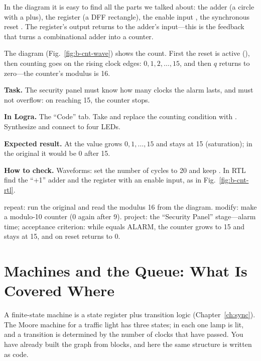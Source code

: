 
In the diagram it is easy to find all the parts we talked about: the adder
(a circle with a plus), the register (a DFF rectangle), the enable input ,
the synchronous reset . The register's output returns to the adder's
input---this is the feedback that turns a combinational
adder into a counter.

The diagram (Fig.~\ref{fig:b-cnt-wave}) shows the count. First the
reset is active (), then counting goes on the rising clock edges: $0, 1,
2, \ldots, 15$, and then $q$ returns to zero---the counter's modulus is 16.


\begin{diybox}
\textbf{Task.} The security panel must know how many clocks the alarm lasts, and must not overflow: on reaching 15, the counter stops.

\textbf{In Logra.} The ``Code'' tab. Take  and replace the counting condition with . Synthesize and connect  to four LEDs.

\textbf{Expected result.} At  the value grows $0,1,\dots,15$ and stays at 15 (saturation); in the original  it would be 0 after 15.

\textbf{How to check.} Waveforms: set the number of cycles to 20 and keep . In RTL find the ``+1'' adder and the register with an enable input, as in Fig.~\ref{fig:b-cnt-rtl}.

 repeat: run the original  and read the modulus 16 from the diagram.  modify: make a modulo-10 counter (0 again after 9).  project: the ``Security Panel'' stage---alarm time; acceptance criterion: while  equals ALARM, the counter grows to 15 and stays at 15, and on reset returns to 0.
\end{diybox}

\section{Machines and the Queue: What Is Covered Where}
\label{sec:b-fsm-ref}

A finite-state machine is a state register plus transition logic
(Chapter~\ref{ch:sync}). The Moore machine for a traffic light has three states;
in each one lamp is lit, and a transition is determined by the number of clocks
that have passed. You have already built the graph from blocks, and here the same
structure is written as code.

